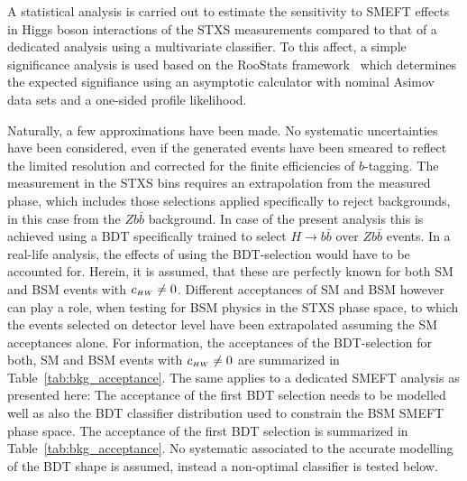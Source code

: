 A statistical analysis is carried out to estimate the sensitivity to SMEFT effects in Higgs boson interactions of the STXS measurements compared to that of a dedicated analysis using a multivariate classifier. To this affect, a simple significance analysis is used based on the {\sc RooStats} framework~\cite{Moneta:2010pm} which determines the expected signifiance using an asymptotic calculator with nominal Asimov data sets and a one-sided profile likelihood. 

Naturally, a few approximations have been made. No systematic uncertainties have been considered, even if the generated events have been smeared to reflect the limited resolution and corrected for the finite efficiencies of $b$-tagging. The measurement in the STXS bins requires an extrapolation from the measured phase, which includes those selections applied specifically to reject backgrounds, in this case from the $Z b\bar{b}$ background. In case of the present analysis this is achieved using a BDT specifically trained to select $H\to b\bar{b}$ over $Z b\bar{b}$ events. In a real-life analysis, the effects of using the BDT-selection would have to be accounted for. Herein, it is assumed, that these are perfectly known for both SM and BSM events with $c_{\scriptscriptstyle HW} \neq 0$. Different acceptances of SM and BSM however can play a role, when testing for BSM physics in the STXS phase space, to which the events selected on detector level have been extrapolated assuming the SM acceptances alone. For information, the acceptances of the BDT-selection for both, SM and BSM events with $c_{\scriptscriptstyle HW} \neq 0$ are summarized in Table~\ref{tab:bkg_acceptance}. The same applies to a dedicated SMEFT analysis as presented here: The acceptance of the first BDT selection needs to be modelled well as also the BDT classifier distribution used to constrain the BSM SMEFT phase space. The acceptance of the first BDT selection is summarized in Table~\ref{tab:bkg_acceptance}. No systematic associated to the accurate modelling of the BDT shape is assumed, instead a non-optimal classifier is tested below.

